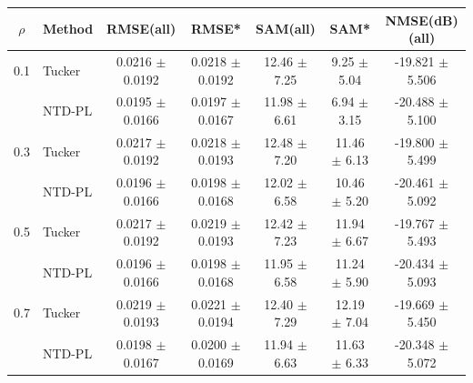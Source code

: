 \begin{tabular}{c l c c c c c}
    \toprule
    $\rho$ & Method & RMSE(all) & RMSE* & SAM(all) & SAM* & NMSE(dB)(all) \\
    \midrule
    0.1 & Tucker & 0.0216 $\pm$ 0.0192 & 0.0218 $\pm$ 0.0192 & 12.46 $\pm$ 7.25 & 9.25 $\pm$ 5.04 & -19.821 $\pm$ 5.506 \\
     & NTD-PL & 0.0195 $\pm$ 0.0166 & 0.0197 $\pm$ 0.0167 & 11.98 $\pm$ 6.61 & 6.94 $\pm$ 3.15 & -20.488 $\pm$ 5.100 \\
    \midrule
    0.3 & Tucker & 0.0217 $\pm$ 0.0192 & 0.0218 $\pm$ 0.0193 & 12.48 $\pm$ 7.20 & 11.46 $\pm$ 6.13 & -19.800 $\pm$ 5.499 \\
     & NTD-PL & 0.0196 $\pm$ 0.0166 & 0.0198 $\pm$ 0.0168 & 12.02 $\pm$ 6.58 & 10.46 $\pm$ 5.20 & -20.461 $\pm$ 5.092 \\
    \midrule
    0.5 & Tucker & 0.0217 $\pm$ 0.0192 & 0.0219 $\pm$ 0.0193 & 12.42 $\pm$ 7.23 & 11.94 $\pm$ 6.67 & -19.767 $\pm$ 5.493 \\
     & NTD-PL & 0.0196 $\pm$ 0.0166 & 0.0198 $\pm$ 0.0168 & 11.95 $\pm$ 6.58 & 11.24 $\pm$ 5.90 & -20.434 $\pm$ 5.093 \\
    \midrule
    0.7 & Tucker & 0.0219 $\pm$ 0.0193 & 0.0221 $\pm$ 0.0194 & 12.40 $\pm$ 7.29 & 12.19 $\pm$ 7.04 & -19.669 $\pm$ 5.450 \\
     & NTD-PL & 0.0198 $\pm$ 0.0167 & 0.0200 $\pm$ 0.0169 & 11.94 $\pm$ 6.63 & 11.63 $\pm$ 6.33 & -20.348 $\pm$ 5.072 \\
    \bottomrule
\end{tabular}
